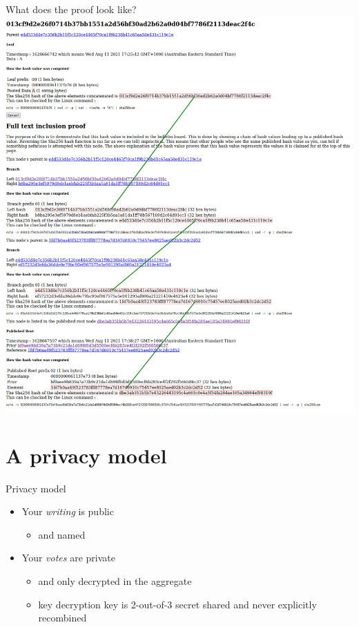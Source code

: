 \documentclass[10pt,xcolor=svgnames,169]{beamer} %
\begin{document}
	
	\begin{frame}[fragile]{What does the proof look like?}
		\includegraphics[scale=0.17]{InclusionProof.png}
	\end{frame}
	
	\section{A privacy model}
	\begin{frame}[standout]{Privacy model} 
		
		\begin{itemize}
			\item Your \emph{writing} is public
				\begin{itemize} 
					\item and named
				\end{itemize}
			\item Your \emph{votes} are private 
				\begin{itemize}
					\item and only decrypted in the aggregate
					\item key decryption key is 2-out-of-3 secret shared and never explicitly recombined
				\end{itemize}
		\end{itemize}
	\end{frame}
	
\end{document}
